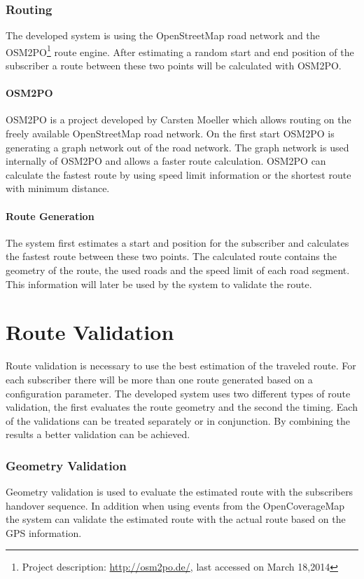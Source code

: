 \documentclass[master,english]{hgbthesis}
\begin{document}
\subsubsection{Routing}
The developed system is using the OpenStreetMap road network and the OSM2PO\footnote{Project description: \url{http://osm2po.de/}, last accessed on March 18,2014} route engine. After estimating a random start and end position of the subscriber a route between these two points will be calculated with OSM2PO.
\paragraph{OSM2PO}
OSM2PO is a project developed by Carsten Moeller which allows routing on the freely available OpenStreetMap road network. On the first start OSM2PO is generating a graph network out of the road network. The graph network is used internally of OSM2PO and allows a faster route calculation. OSM2PO can calculate the fastest route by using speed limit information or the shortest route with minimum distance.
\paragraph{Route Generation}
The system first estimates a start and position for the subscriber and calculates the fastest route between these two points. The calculated route contains the geometry of the route, the used roads and the speed limit of each road segment. This information will later be used by the system to validate the route.
\section{Route Validation}
\label{sec:routevalidation}
Route validation is necessary to use the best estimation of the traveled route. For each subscriber there will be more than one route generated based on a configuration parameter. The developed system uses two different types of route validation, the first evaluates the route geometry and the second the timing. Each of the validations can be treated separately or in conjunction. By combining the results a better validation can be achieved.
\subsubsection{Geometry Validation}
Geometry validation is used to evaluate the estimated route with the subscribers handover sequence. In addition when using events from the OpenCoverageMap the system can validate the estimated route with the actual route based on the GPS information.
\end{document}
